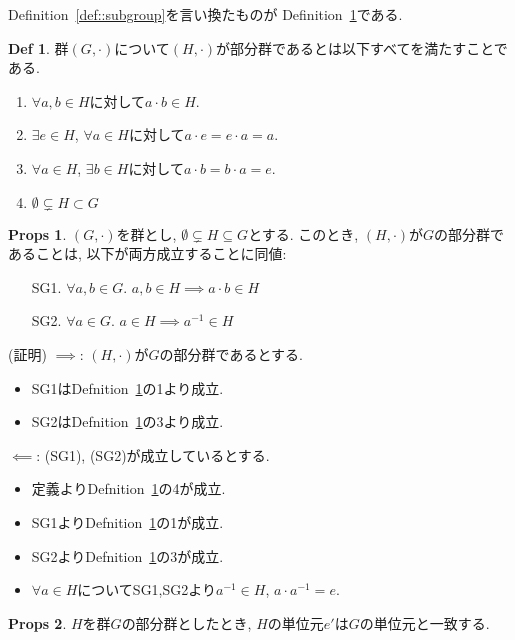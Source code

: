 \documentclass[dvipdfmx]{jsarticle}
\theoremstyle{definition}
\newtheorem{props}{Props}
\newtheorem{definition}{Def}
\numberwithin{equation}{section}
\numberwithin{props}{section}
\numberwithin{definition}{section}
\numberwithin{note}{section}
\begin{document}
\par Definition~\ref{def::subgroup}を言い換たものが Definition~\ref{def::subgroup1}である.
\begin{definition}\label{def::subgroup1}
     群$(G,\cdot)$について$(H,\cdot )$が部分群であるとは以下すべてを満たすことである.
     \begin{enumerate}
          \item $\forall a,b\in H$に対して$a\cdot b\in H$.
          \item $\exists e \in H$, $\forall a \in H$に対して$a\cdot e=e\cdot a=a$.
          \item $\forall a \in H$, $\exists b\in H$に対して$a\cdot b=b\cdot a=e$.
          \item $\emptyset\subsetneq H\subset G$
     \end{enumerate}
\end{definition}
\begin{props}\label{thm::subgroup}
     $(G, \cdot)$を群とし, $\emptyset\subsetneq H\subseteq G$とする. このとき, $(H, \cdot)$が$G$の部分群であることは, 以下が両方成立することに同値:
     \begin{enumerate}
          \item[SG1.]  $\forall a, b\in G$. $a, b\in H\implies a\cdot b\in H$
          \item[SG2.]  $\forall a\in G$. $a\in H \implies a^{-1}\in H$
     \end{enumerate}
\end{props}
(証明)
$\implies$: $(H, \cdot)$が$G$の部分群であるとする.\\
\begin{itemize}
     \item SG1はDefnition~\ref{def::subgroup1}の1より成立.
     \item SG2はDefnition~\ref{def::subgroup1}の3より成立.
\end{itemize}
$\impliedby$: (SG1), (SG2)が成立しているとする.
\begin{itemize}
     \item 定義よりDefnition~\ref{def::subgroup1}の4が成立.
     \item  SG1よりDefnition~\ref{def::subgroup1}の1が成立.
     \item SG2よりDefnition~\ref{def::subgroup1}の3が成立.
     \item $\forall a\in H$についてSG1,SG2より$a^{-1}\in H$, $a\cdot a^{-1}=e$.
\end{itemize}
\begin{props}
     $H$を群$G$の部分群としたとき, $H$の単位元$e'$は$G$の単位元と一致する.
\end{props}
\end{document}
